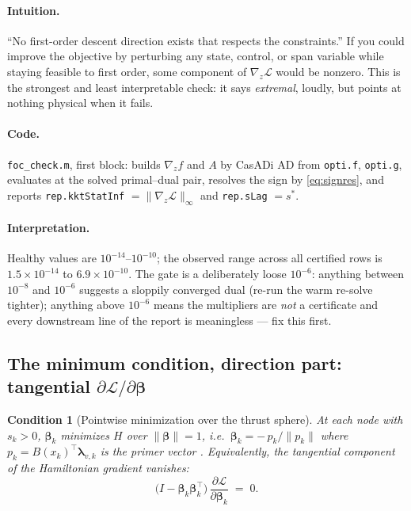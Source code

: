 \documentclass[11pt]{article}
\newcommand{\vlam}{\boldsymbol{\lambda}}
\newcommand{\vbeta}{\boldsymbol{\beta}}
\newcommand{\Lag}{\mathcal{L}}
\newcommand{\Ham}{H}
\newcommand{\file}[1]{\texttt{#1}}
\newcommand{\code}[1]{\texttt{#1}}
\newtheorem{condition}{Condition}
\begin{document}
\paragraph{Intuition.}
``No first-order descent direction exists that respects the constraints.'' If
you could improve the objective by perturbing any state, control, or span
variable while staying feasible to first order, some component of
$\nabla_z\Lag$ would be nonzero. This is the strongest and least interpretable
check: it says \emph{extremal}, loudly, but points at nothing physical when it
fails.

\paragraph{Code.}
\file{foc\_check.m}, first block: builds
$\nabla_z f$ and $A$ by CasADi AD from \code{opti.f}, \code{opti.g}, evaluates
at the solved primal--dual pair, resolves the sign by \eqref{eq:signres}, and
reports \code{rep.kktStatInf} $=\|\nabla_z\Lag\|_\infty$ and
\code{rep.sLag} $=s^\ast$.

\paragraph{Interpretation.}
Healthy values are $10^{-14}$--$10^{-10}$; the observed range across all
certified rows is $1.5\times10^{-14}$ to $6.9\times10^{-10}$. The gate is a
deliberately loose $10^{-6}$: anything between $10^{-8}$ and $10^{-6}$
suggests a sloppily converged dual (re-run the warm re-solve tighter);
anything above $10^{-6}$ means the multipliers are \emph{not} a certificate
and every downstream line of the report is meaningless --- fix this first.

\subsection{The minimum condition, direction part: tangential
$\partial\Lag/\partial\vbeta$}
\label{sec:direction}

\begin{condition}[Pointwise minimization over the thrust sphere]
At each node with $s_k>0$, $\vbeta_k$ minimizes $\Ham$ over
$\|\vbeta\|=1$, i.e.\ $\vbeta_k = -\,p_k/\|p_k\|$ where
$p_k = B(x_k)^{\!\top}\vlam_{v,k}$ is the primer vector \cite{Lawden1963}.
Equivalently, the \emph{tangential} component of the Hamiltonian gradient
vanishes:
\begin{equation}
\bigl(I-\vbeta_k\vbeta_k^{\!\top}\bigr)\,
\frac{\partial \Lag}{\partial \vbeta_k} \;=\; 0 .
\label{eq:tangential}
\end{equation}
\end{condition}
\end{document}
